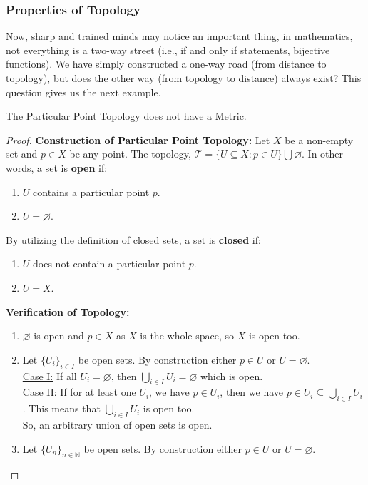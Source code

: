 \subsubsection{Properties of Topology}
\noindent Now, sharp and trained minds may notice an important thing, in mathematics, not everything is a two-way street (i.e., if and only if statements, bijective functions). We have simply constructed a one-way road (from distance to topology), but does the other way (from topology to distance) always exist? This question gives us the next example.
\begin{Example}\label{particular_point_topology}
    The Particular Point Topology does not have a Metric.
\end{Example}
\begin{proof}
    \textbf{Construction of Particular Point Topology:} Let $X$ be a non-empty set and $p\in X$ be any point. The topology, $\mathcal{T}=\{U\subseteq X:p\in U\}\bigcup \varnothing$. In other words, a set is \textbf{open} if:
    \begin{enumerate}
        \item $U$ contains a particular point $p$.
        \item $U=\varnothing$.
    \end{enumerate}
    By utilizing the definition of closed sets, a set is \textbf{closed} if:
    \begin{enumerate}
        \item $U$ does not contain a particular point $p$.
        \item $U=X$.
    \end{enumerate}
    \textbf{Verification of Topology:}
    \begin{enumerate}
        \item $\varnothing$ is open and $p\in X$ as $X$ is the whole space, so $X$ is open too.
        \item Let $\{U_i\}_{i\in I}$ be open sets. By construction either $p\in U$ or $U=\varnothing$.\\
        \underline{Case I:} If all $U_i=\varnothing$, then $\bigcup_{i\in I}U_i=\varnothing$ which is open.\\
        \underline{Case II:} If for at least one $U_i$, we have $p\in U_i$, then we have $p\in U_i\subseteq \bigcup_{i\in I}U_i$. This means that $\bigcup_{i\in I}U_i$ is open too.\\
        So, an arbitrary union of open sets is open.
        \item Let $\{U_n\}_{n\in \mathbb{N}}$ be open sets. By construction either $p\in U$ or $U=\varnothing$.\\

\end{enumerate}
\end{proof}

